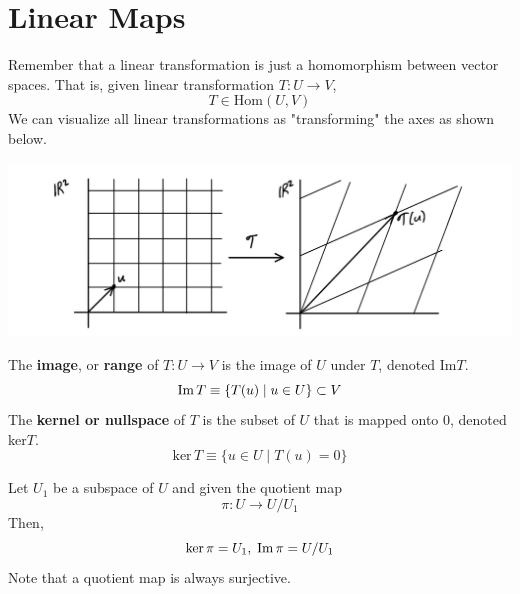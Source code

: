 \section{Linear Maps}

  Remember that a linear transformation is just a homomorphism between vector spaces. That is, given linear transformation $T: U \longrightarrow V$, 
  \begin{equation}
    T \in \text{Hom}(U,V)
  \end{equation}
  We can visualize all linear transformations as "transforming" the axes as shown below. 
  \begin{center}
    \includegraphics[scale=0.25]{img/Linear_Map.PNG}
  \end{center}

  \begin{definition}[Image]
    The \textbf{image}, or \textbf{range} of $T: U \longrightarrow V$ is the image of $U$ under $T$, denoted Im$T$. 
    \begin{equation}
      \im{T} \equiv \{ T(u) \; | \; u \in U\} \subset V
    \end{equation}
    The \textbf{kernel or nullspace} of $T$ is the subset of $U$ that is mapped onto $0$, denoted ker$T$. 
    \begin{equation}
      \text{ker}\,T \equiv \{ u \in U \; | \; T(u) = 0\}
    \end{equation}
  \end{definition}

  \begin{example}
    Let $U_1$ be a subspace of $U$ and given the quotient map
    \begin{equation}
      \pi: U \longrightarrow U / U_1
    \end{equation}
    Then, 
    \begin{equation}
      \text{ker}\,\pi = U_1, \; \im{\pi} = U / U_1
    \end{equation}
    Note that a quotient map is always surjective. 
  \end{example}

